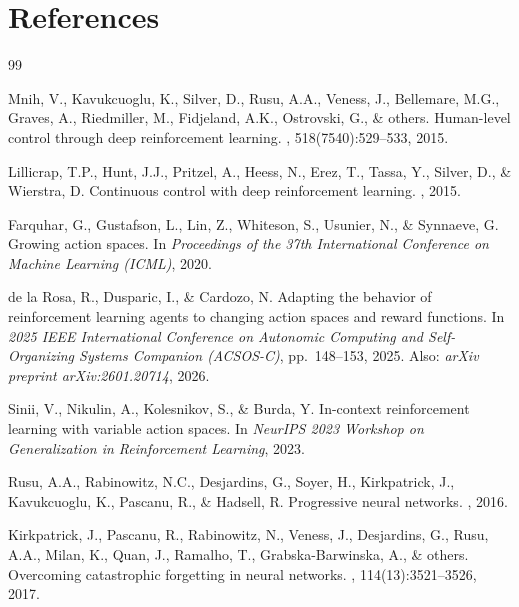 \documentclass{article}
\begin{document}
\section*{References}
{\small
\begin{thebibliography}{99}

Mnih, V., Kavukcuoglu, K., Silver, D., Rusu, A.A., Veness, J., Bellemare,
M.G., Graves, A., Riedmiller, M., Fidjeland, A.K., Ostrovski, G., \& others.
\newblock Human-level control through deep reinforcement learning.
, 518(7540):529--533, 2015.

Lillicrap, T.P., Hunt, J.J., Pritzel, A., Heess, N., Erez, T., Tassa, Y.,
Silver, D., \& Wierstra, D.
\newblock Continuous control with deep reinforcement learning.
, 2015.

Farquhar, G., Gustafson, L., Lin, Z., Whiteson, S., Usunier, N., \& Synnaeve,
G.
\newblock Growing action spaces.
\newblock In {\it Proceedings of the 37th International Conference on Machine
  Learning (ICML)}, 2020.

de la Rosa, R., Dusparic, I., \& Cardozo, N.
\newblock Adapting the behavior of reinforcement learning agents to changing
  action spaces and reward functions.
\newblock In {\it 2025 IEEE International Conference on Autonomic Computing and
  Self-Organizing Systems Companion (ACSOS-C)}, pp.~148--153, 2025.
\newblock Also: {\it arXiv preprint arXiv:2601.20714}, 2026.

Sinii, V., Nikulin, A., Kolesnikov, S., \& Burda, Y.
\newblock In-context reinforcement learning with variable action spaces.
\newblock In {\it NeurIPS 2023 Workshop on Generalization in Reinforcement
  Learning}, 2023.

Rusu, A.A., Rabinowitz, N.C., Desjardins, G., Soyer, H., Kirkpatrick, J.,
Kavukcuoglu, K., Pascanu, R., \& Hadsell, R.
\newblock Progressive neural networks.
, 2016.

Kirkpatrick, J., Pascanu, R., Rabinowitz, N., Veness, J., Desjardins, G.,
Rusu, A.A., Milan, K., Quan, J., Ramalho, T., Grabska-Barwinska, A., \&
others.
\newblock Overcoming catastrophic forgetting in neural networks.
,
  114(13):3521--3526, 2017.


\end{thebibliography}}
\end{document}
